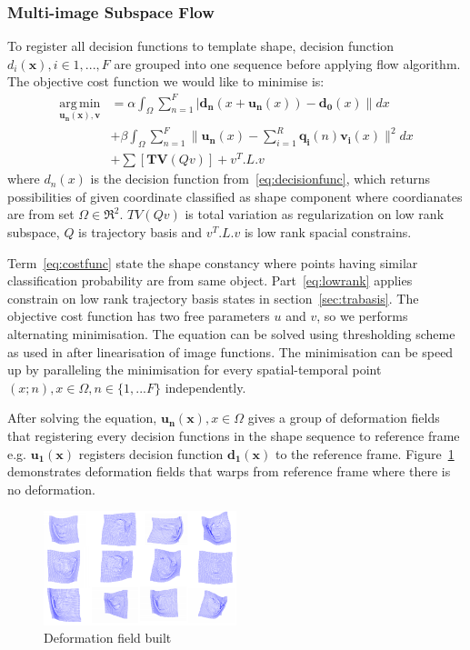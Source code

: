 \subsubsection{Multi-image Subspace Flow}
To register all decision functions to template shape, decision function $d_i(\bm{x}), i \in {1,...,F}$ are grouped into one sequence before applying flow algorithm. The objective cost function we would like to minimise is:
\begin{align}
    \operatorname*{arg\,min}_{\bm{u_n}(\bm{x}), \bm{v}}&=\alpha \int_{\Omega}\sum_{n=1}^F|\bm{d_n}(x+\bm{u_n}(x))-\bm{d_0}(x)\| dx  \label{eq:costfunc}\\
    &+ \beta \int_{\Omega}\sum_{n=1}^F\|\bm{u_n}(x)-\sum_{i=1}^R\bm{q_i}(n)\bm{v_i}(x)\|^2 dx \label{eq:lowrank}\\
    &+ \sum[\bm{TV}(Qv)]  + v^T.L.v
\end{align}
where $d_n(x)$ is the decision function from~\eqref{eq:decisionfunc}, which returns possibilities of given coordinate classified as shape component where coordianates are from set $\Omega \in \Re^2$. $TV(Qv)$ is total variation as regularization on low rank subspace, $Q$ is trajectory basis and $v^T.L.v$ is low rank spacial constrains.

Term~\eqref{eq:costfunc} state the shape constancy where points having similar classification probability are from same object.
Part~\eqref{eq:lowrank} applies constrain on low rank trajectory basis states in section~\ref{sec:trabasis}.
The objective cost function has two free parameters $u$ and $v$, so we performs alternating minimisation. The equation can be solved using thresholding scheme as used in \cite{?} after linearisation of image functions. The minimisation can be speed up by paralleling the minimisation for every spatial-temporal point $(x;n), x \in \Omega, n \in \{1,...F\}$ independently.

After solving the equation, $\bm{u_n}(\bm{x}), x \in \Omega$ gives a group of deformation fields that registering every decision functions in the shape sequence to reference frame e.g. $\bm{u_1}(\bm{x})$ registers decision function $\bm{d_1}(\bm{x})$ to the reference frame. Figure~\ref{fig:deformationfield} demonstrates deformation fields that warps from reference frame where there is no deformation.

\begin{figure}[h!]
    \centering
        \includegraphics[width=0.5\textwidth]{resources/df}
    \caption{Deformation field built}
    \label{fig:deformationfield}
\end{figure}

